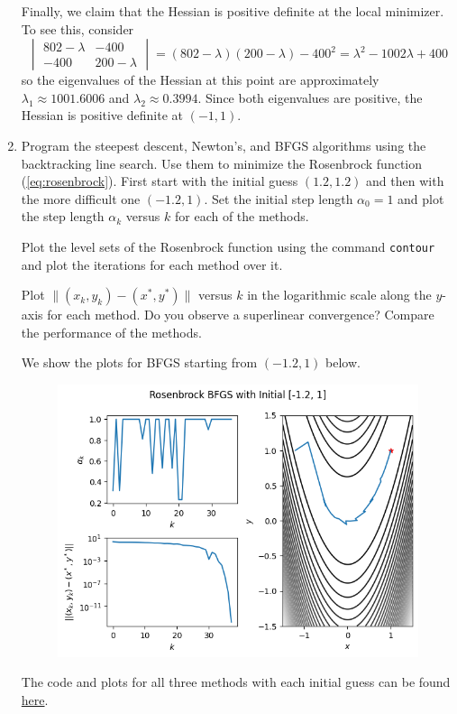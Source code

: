 \documentclass{../kin_math}
\begin{document}
\begin{questions}
\begin{enumerate}
\begin{solution}
      Finally, we claim that the Hessian is positive definite at the local minimizer. To see this, consider
      \begin{equation*}
        \begin{vmatrix} 802 - \lambda & -400 \\ -400 & 200 - \lambda \end{vmatrix} = (802 - \lambda)(200 - \lambda) - 400^2 = \lambda^2 - 1002 \lambda + 400
      \end{equation*}
      so the eigenvalues of the Hessian at this point are approximately $\lambda_1 \approx 1001.6006$ and $\lambda_2 \approx 0.3994$. Since both eigenvalues are positive, the Hessian is positive definite at $(-1, 1)$.
    \end{solution}
    \item Program the steepest descent, Newton's, and BFGS algorithms using the backtracking line search. Use them to minimize the Rosenbrock function (\ref{eq:rosenbrock}). First start with the initial guess $(1.2, 1.2)$ and then with the more difficult one $(-1.2, 1)$. Set the initial step length $\alpha_0 = 1$ and plot the step length $\alpha_k$ versus $k$ for each of the methods.

    Plot the level sets of the Rosenbrock function using the command \texttt{contour} and plot the iterations for each method over it.

    Plot $\lVert (x_k, y_k) - (x^*, y^*) \rVert$ versus $k$ in the logarithmic scale along the $y$-axis for each method. Do you observe a superlinear convergence? Compare the performance of the methods.
    \begin{solution}
      We show the plots for BFGS starting from $(-1.2, 1)$ below.
      \begin{figure}
        \centering
        \includegraphics[scale=0.7]{rosenbrock.png}
      \end{figure}
      The code and plots for all three methods with each initial guess can be found \href{https://github.com/elijahkin/amsc660/blob/main/hw10/hw10.ipynb}{here}.


\end{solution}
\end{enumerate}
\end{questions}
\end{document}
